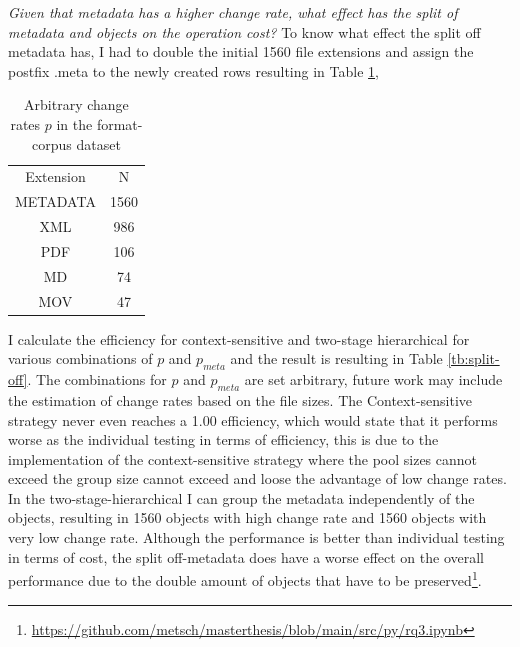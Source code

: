 \textit{Given that metadata has a higher change rate, what effect has the split of metadata and objects on the operation cost?}
To know what effect the split off metadata has, I had to double the initial 1560 file extensions and assign the postfix .meta to the newly created rows resulting in Table \ref{tb:metadata},
\begin{table}[t]
    \centering
    \begin{tabular}{c c}
        Extension & N \\
        METADATA & 1560 \\
        XML& 986 \\
        PDF& 106  \\
        MD& 74  \\
        MOV& 47  
    \end{tabular}
    \caption{Arbitrary change rates $p$ in the format-corpus dataset}
    \label{tb:metadata}
\end{table}
I calculate the efficiency for context-sensitive and two-stage hierarchical for various combinations of $p$ and $p_{meta}$ and the result is resulting in Table \ref{tb:split-off}. The combinations for $p$ and $p_{meta}$ are set arbitrary, future work may include the estimation of change rates based on the file sizes.
The Context-sensitive strategy never even reaches a 1.00 efficiency, which would state that it performs worse as the individual testing in terms of efficiency, this is due to the implementation of the context-sensitive strategy where the pool sizes cannot exceed the group size cannot exceed and loose the advantage of low change rates. In the two-stage-hierarchical I can group the metadata independently of the objects, resulting in 1560 objects with high change rate and 1560 objects with very low change rate. Although the performance is better than individual testing in terms of cost, the split off-metadata does have a worse effect on the overall performance due to the double amount of objects that have to be preserved\footnote{\url{https://github.com/metsch/masterthesis/blob/main/src/py/rq3.ipynb}}.
